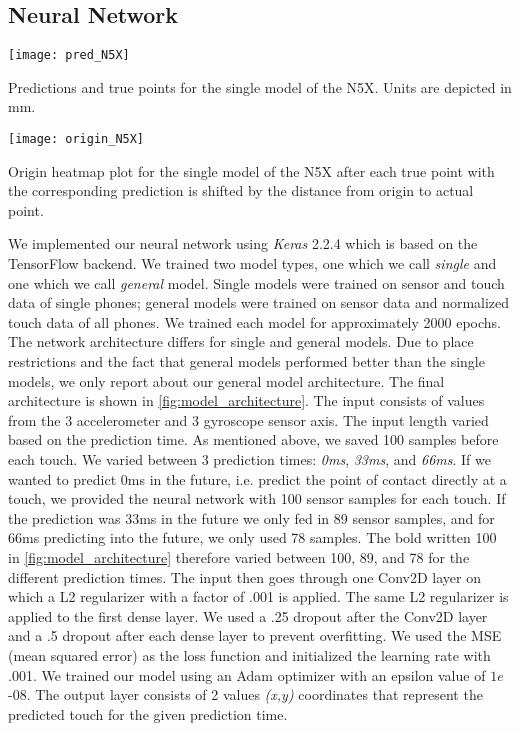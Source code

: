 \subsection{Neural Network}
\begin{marginfigure}
	\vspace{-0.2cm}    
	\texttt{[image: pred\_N5X]}
	\caption{Predictions and true points for the single model of the N5X. Units are depicted in mm.\newline}
	\label{fig:pred_N5X}
\end{marginfigure}
\begin{marginfigure}
	\texttt{[image: origin\_N5X]}
	\caption{Origin heatmap plot for the single model of the N5X after each true point with the corresponding prediction is shifted by the distance from origin to actual point.}
	\label{fig:origin_N5X}
\end{marginfigure}
We implemented our neural network using \textit{Keras} 2.2.4 which is based on the TensorFlow backend.
We trained two model types, one which we call \textit{single} and one which we call \textit{general} model.
Single models were trained on sensor and touch data of single phones; general models were trained on sensor data and normalized touch data of all phones.
We trained each model for approximately 2000 epochs.
The network architecture differs for single and general models.
Due to place restrictions and the fact that general models performed better than the single models, we only report about our general model architecture.
The final architecture is shown in \cref{fig:model_architecture}.
The input consists of values from the 3 accelerometer and 3 gyroscope sensor axis.
The input length varied based on the prediction time.
As mentioned above, we saved 100 samples before each touch.
We varied between 3 prediction times: \textit{0ms}, \textit{33ms}, and \textit{66ms}.
If we wanted to predict 0ms in the future, i.e. predict the point of contact directly at a touch, we provided the neural network with 100 sensor samples for each touch.
If the prediction was 33ms in the future we only fed in 89 sensor samples, and for 66ms predicting into the future, we only used 78 samples.
The bold written 100 in \cref{fig:model_architecture} therefore varied between 100, 89, and 78 for the different prediction times.
The input then goes through one Conv2D layer on which a L2 regularizer with a factor of .001 is applied.
The same L2 regularizer is applied to the first dense layer.
We used a .25 dropout after the Conv2D layer and a .5 dropout after each dense layer to prevent overfitting.
We used the MSE (mean squared error) as the loss function and initialized the learning rate with .001.
We trained our model using an Adam optimizer with an epsilon value of $ 1e$-08.
The output layer consists of 2 values \textit{(x,y)} coordinates that represent the predicted touch for the given prediction time.

